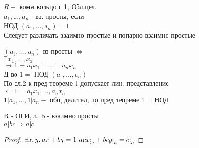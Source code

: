 
$ R - $ комм кольцо с 1, Обл.цел. \\
$ a_1, ..., a_n $ - вз. просты, если \\
НОД $  (a_1, ..., a_n) = 1$\\
Следует различать взаимно простые и попарно взаимно простые \\
\begin{theorem}
	$  (a_1, ..., a_n) $ вз просты $ \Leftrightarrow $ \\
	$ \exists x_1, ..., x_n $ \\
	$ \Rightarrow 1 = a_1x_1 + ... + a_nx_n $ \\
	Д-во $ 1 = $ НОД $  (a_1, ..., a_n) $ \\
	По сл.2 к пред теореме 1 допускает лин. представление \\
	$ \Leftarrow 1 =  a_1x_1, ..., a_nx_n $ \\
	$ 1 | a_1, ..., 1 | a_n -$ общ делител, по пред теореме 1 = НОД 
\end{theorem}
\begin{theorem}
	R - ОГИ, a, b - взаимно просты \\
	$ a | bc \Rightarrow a | c $ \\
	\begin{proof}
		$ \exists x, y, ax + by = 1, acx_{\divby a} + bcy_{\divby a} = c_{\divby a} $
	\end{proof}
\end{theorem}

